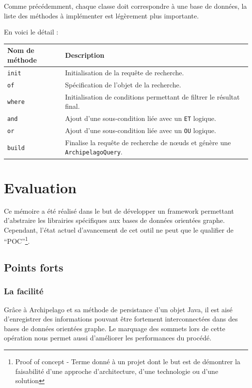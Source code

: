 \documentclass[a4paper,fleqn,12pt,oneside]{report}
\begin{document}
Comme précédemment, chaque classe doit correspondre à une base de données, la liste des méthodes à implémenter est légèrement plus importante.

En voici le détail :

\begin{tabular}[c]{|l|M{12cm}|}

\hline
\textbf{Nom de méthode} & \textbf{Description}  \tabularnewline
\hline
\texttt{init} & Initialisation de la requête de recherche.  \tabularnewline
\hline
\texttt{of} & Spécification de l'objet de la recherche.  \tabularnewline
\hline
\texttt{where} & Initialisation de conditions permettant de filtrer le résultat final.  \tabularnewline
\hline
\texttt{and} & Ajout d'une sous-condition liée avec un \texttt{ET} logique. \tabularnewline
\hline
\texttt{or} & Ajout d'une sous-condition liée avec un \texttt{OU} logique.   \tabularnewline
\hline
\texttt{build} & Finalise la requête de recherche de nœuds et génère une \texttt{ArchipelagoQuery}.   \tabularnewline \hline

\end{tabular}


\chapter{Evaluation}

Ce mémoire a été réalisé dans le but de développer un framework permettant d'abstraire les librairies spécifiques aux bases de données orientées graphe. Cependant, l'état actuel d'avancement de cet outil ne peut que le qualifier de \enquote{POC}\footnote{Proof of concept - Terme donné à un projet dont le but est de démontrer la faisabilité d'une approche d'architecture, d'une technologie ou d'une solution }.


\section{Points forts}

\subsection{La facilité}

Grâce à Archipelago et sa méthode de persistance d'un objet Java, il est aisé d'enregistrer des informations pouvant être fortement interconnectées dans des bases de données orientées graphe. 
Le marquage des sommets lors de cette opération nous permet aussi d'améliorer les performances du procédé. 
\end{document}
